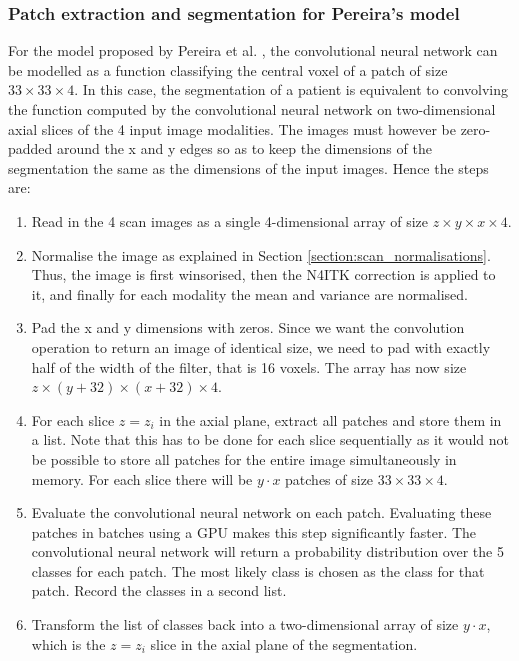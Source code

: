 \documentclass[12pt,a4paper,twoside,openright]{report}
\begin{document}
\subsubsection{Patch extraction and segmentation for Pereira's model}
For the model proposed by Pereira et al. \cite{pereira}, the convolutional neural network can be modelled as a function classifying the central voxel of a patch of size $33 \times 33 \times 4$. In this case, the segmentation of a patient is equivalent to convolving the function computed by the convolutional neural network on two-dimensional axial slices of the 4 input image modalities. The images must however be zero-padded around the x and y edges so as to keep the dimensions of the segmentation the same as the dimensions of the input images. Hence the steps are:
\begin{enumerate}
	\item Read in the 4 scan images as a single 4-dimensional array of size $z \times y \times x \times 4$.
	\item Normalise the image as explained in Section \ref{section:scan_normalisations}. Thus, the image is first winsorised, then the N4ITK correction is applied to it, and finally for each modality the mean and variance are normalised.
	\item Pad the x and y dimensions with zeros. Since we want the convolution operation to return an image of identical size, we need to pad with exactly half of the width of the filter, that is 16 voxels. The array has now size $z \times (y + 32) \times (x + 32) \times 4$.
	\item For each slice $z = z_i$ in the axial plane, extract all patches and store them in a list. Note that this has to be done for each slice sequentially as it would not be possible to store all patches for the entire image simultaneously in memory. For each slice there will be $y \cdot x$ patches of size $33 \times 33 \times 4$.
	\item Evaluate the convolutional neural network on each patch. Evaluating these patches in batches using a GPU makes this step significantly faster. The convolutional neural network will return a probability distribution over the 5 classes for each patch. The most likely class is chosen as the class for that patch. Record the classes in a second list.
	\item Transform the list of classes back into a two-dimensional array of size $y \cdot x$, which is the $z = z_i$ slice in the axial plane of the segmentation.
\end{enumerate}
\end{document}

